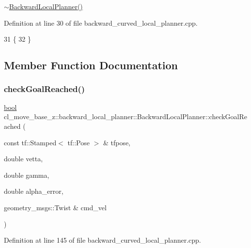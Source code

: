 \hyperlink{classcl__move__base__z_1_1backward__local__planner_1_1BackwardLocalPlanner_a6a36aa94617786c6958e861e64abb862}{$\sim$\+Backward\+Local\+Planner()} 

Definition at line 30 of file backward\+\_\+curved\+\_\+local\+\_\+planner.\+cpp.


\begin{DoxyCode}
31         \{
32         \}
\end{DoxyCode}


\subsection{Member Function Documentation}
\mbox{\label{classcl__move__base__z_1_1backward__local__planner_1_1BackwardLocalPlanner_a6c4363e82119a6a8a5a3bfe309280898}} 
\subsubsection{\texorpdfstring{check\+Goal\+Reached()}{checkGoalReached()}}
{\footnotesize\ttfamily \hyperlink{classbool}{bool} cl\+\_\+move\+\_\+base\+\_\+z\+::backward\+\_\+local\+\_\+planner\+::\+Backward\+Local\+Planner\+::check\+Goal\+Reached (\begin{DoxyParamCaption}\item[{const tf\+::\+Stamped$<$ tf\+::\+Pose $>$ \&}]{tfpose,  }\item[{double}]{vetta,  }\item[{double}]{gamma,  }\item[{double}]{alpha\+\_\+error,  }\item[{geometry\+\_\+msgs\+::\+Twist \&}]{cmd\+\_\+vel }\end{DoxyParamCaption})\hspace{0.3cm}{\ttfamily [private]}}



Definition at line 145 of file backward\+\_\+curved\+\_\+local\+\_\+planner.\+cpp.




